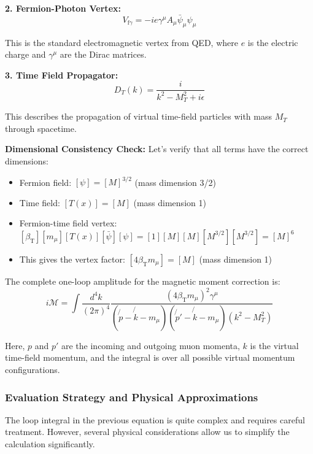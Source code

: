 \documentclass[12pt,a4paper]{article}
\newcommand{\Tfield}{T(x)}
\newcommand{\betaT}{\beta_{\text{T}}}
\begin{document}
	\textbf{2. Fermion-Photon Vertex:}
	\begin{equation}
		V_{\text{f}\gamma} = -ie\gamma^\mu A_\mu \bar{\psi}_\mu \psi_\mu
	\end{equation}
	
	This is the standard electromagnetic vertex from QED, where $e$ is the electric charge and $\gamma^\mu$ are the Dirac matrices.
	
	\textbf{3. Time Field Propagator:}
	\begin{equation}
		D_T(k) = \frac{i}{k^2 - M_T^2 + i\epsilon}
	\end{equation}
	
	This describes the propagation of virtual time-field particles with mass $M_T$ through spacetime.
	
	\textbf{Dimensional Consistency Check:}
	Let's verify that all terms have the correct dimensions:
	\begin{itemize}
		\item Fermion field: $[\psi] = [M]^{3/2}$ (mass dimension 3/2)
		\item Time field: $[\Tfield] = [M]$ (mass dimension 1)
		\item Fermion-time field vertex: $[\betaT][m_\mu][\Tfield][\bar{\psi}][\psi] = [1][M][M][M^{3/2}][M^{3/2}] = [M]^6$
		\item This gives the vertex factor: $[4\betaT m_\mu] = [M]$ (mass dimension 1)
	\end{itemize}
	
	The complete one-loop amplitude for the magnetic moment correction is:
	\begin{equation}
		i\mathcal{M} = \int \frac{d^4k}{(2\pi)^4} \frac{(4\betaT m_\mu)^2 \gamma^\mu}{(\not{p} - \not{k} - m_\mu)(\not{p}' - \not{k} - m_\mu)(k^2 - M_T^2)}
	\end{equation}
	
	Here, $p$ and $p'$ are the incoming and outgoing muon momenta, $k$ is the virtual time-field momentum, and the integral is over all possible virtual momentum configurations.
	
	\subsubsection{Evaluation Strategy and Physical Approximations}
	
	The loop integral in the previous equation is quite complex and requires careful treatment. However, several physical considerations allow us to simplify the calculation significantly.
	
\end{document}
